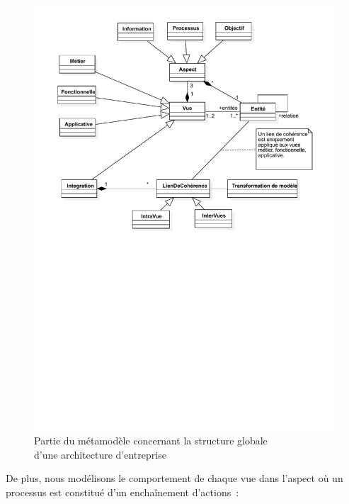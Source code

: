 \begin{figure}[!ht]
    \centering
    \includegraphics[trim= 0cm 14cm 0cm 1cm, clip, width=1\textwidth]{figures/4_demarche/ea3m.pdf}
    \caption{Partie du métamodèle concernant la structure globale \\
             d'une architecture d'entreprise} \label{fig:ea3m}
\end{figure}


De plus, nous modélisons le comportement de chaque vue dans l'aspect
 où un processus est constitué d'un enchaînement d'actions~:

